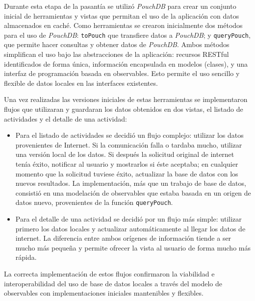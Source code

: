 Durante esta etapa de la pasantía se utilizó \textit{PouchDB} para crear un conjunto inicial de herramientas y vistas que permitan el uso de la aplicación con datos almacenados en caché. Como herramientas se crearon inicialmente dos métodos para el uso de \textit{PouchDB}: \texttt{toPouch} que transfiere datos a \textit{PouchDB}; y \texttt{queryPouch}, que permite hacer consultas y obtener datos de \textit{PouchDB}. Ambos métodos simplifican el uso bajo las abstracciones de la aplicación: recursos RESTful identificados de forma única, información encapsulada en modelos (clases), y una interfaz de programación basada en observables. Esto permite el uso sencillo y flexible de datos locales en las interfaces existentes.

Una vez realizadas las versiones iniciales de estas herramientas se implementaron flujos que utilizaran y guardaran los datos obtenidos en dos vistas, el listado de actividades y el detalle de una actividad:
\begin{itemize}
  \item Para el listado de actividades se decidió un flujo complejo: utilizar los datos provenientes de Internet. Si la comunicación falla o tardaba mucho, utilizar una versión local de los datos. Si después la solicitud original de internet tenía éxito, notificar al usuario y mostrarlos si éste aceptaba; en cualquier momento que la solicitud tuviese éxito, actualizar la base de datos con los nuevos resultados. La implementación, más que un trabajo de base de datos, consistió en una modelación de observables que estaba basada en un origen de datos nuevo, provenientes de la función \texttt{queryPouch}.

  \item Para el detalle de una actividad se decidió por un flujo más simple: utilizar primero los datos locales y actualizar automáticamente al llegar los datos de internet. La diferencia entre ambos orígenes de información tiende a ser mucho más pequeña y permite ofrecer la vista al usuario de forma mucho más rápida.
\end{itemize}

La correcta implementación de estos flujos confirmaron la viabilidad e interoperabilidad del uso de base de datos locales a través del modelo de observables con implementaciones iniciales mantenibles y flexibles.
